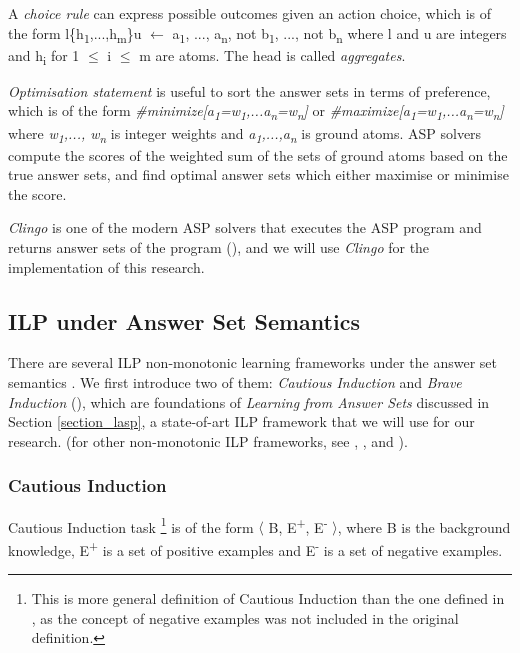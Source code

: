 \documentclass[12pt,twoside]{report}
\theoremstyle{plain}
\theoremstyle{definition}
\begin{document}
A \textit{choice rule} can express possible outcomes given an action choice, which is of the form
l\{h\textsubscript{1},...,h\textsubscript{m}\}u $\leftarrow$ a\textsubscript{1}, ..., a\textsubscript{n}, not b\textsubscript{1}, ..., not b\textsubscript{n} where  l and u are integers and h\textsubscript{i} for 1 $\leq$ i $\leq$ m are atoms. The head is called \textit{aggregates}.

\textit{Optimisation statement} is useful to sort the answer sets in terms of preference, which is of the form
\textit{\#minimize[a\textsubscript{1}=w\textsubscript{1},...a\textsubscript{n}=w\textsubscript{n}]} or \textit{\#maximize[a\textsubscript{1}=w\textsubscript{1},...a\textsubscript{n}=w\textsubscript{n}]} where \textit{w\textsubscript{1},..., w\textsubscript{n}} is integer weights and \textit{a\textsubscript{1},...,a\textsubscript{n}} is ground atoms.  ASP solvers compute the scores of the weighted sum of the sets of ground atoms based on the true answer sets, and find optimal answer sets which either maximise or minimise the score.

\textit{Clingo} is one of the modern ASP solvers that executes the ASP program and returns answer sets of the program (\cite{Gebser2011}), and we will use \textit{Clingo} for the implementation of this research.


\subsection{ILP under Answer Set Semantics}

There are several ILP non-monotonic learning frameworks under the answer set semantics . We first introduce two of them: \textit{Cautious Induction} and \textit{Brave Induction} (\cite{Sakama2009}), which are foundations of \textit{Learning from Answer Sets} discussed in Section \ref{section_lasp}, a state-of-art ILP framework that we will use for our research.  (for other non-monotonic ILP frameworks, see \cite{Otero2001}, \cite{Inoue2014}, \cite{Corapi2012} and \cite{DeRaedt1997}).
\subsubsection{Cautious Induction }
Cautious Induction task \footnote{This is more general definition of Cautious Induction than the one defined in \cite{Sakama2009}, as the concept of negative examples was not included in the original definition.} is of the form $\langle$ B, E\textsuperscript{+}, E\textsuperscript{-} $\rangle$, where B is the background knowledge, E\textsuperscript{+} is a set of positive examples and E\textsuperscript{-} is a set of negative examples.
\end{document}
